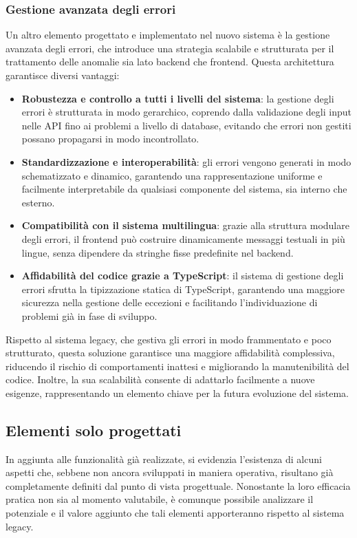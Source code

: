 \subsubsection{Gestione avanzata degli errori}
Un altro elemento progettato e implementato nel nuovo sistema è la gestione avanzata degli errori, che introduce una strategia scalabile e strutturata per il trattamento delle anomalie sia lato backend che frontend.
%
Questa architettura garantisce diversi vantaggi:
\begin{itemize}
  \item \textbf{Robustezza e controllo a tutti i livelli del sistema}: la gestione degli errori è strutturata in modo gerarchico, coprendo dalla validazione degli input nelle API fino ai problemi a livello di database, evitando che errori non gestiti possano propagarsi in modo incontrollato.
  \item \textbf{Standardizzazione e interoperabilità}: gli errori vengono generati in modo schematizzato e dinamico, garantendo una rappresentazione uniforme e facilmente interpretabile da qualsiasi componente del sistema, sia interno che esterno.
  \item \textbf{Compatibilità con il sistema multilingua}: grazie alla struttura modulare degli errori, il frontend può costruire dinamicamente messaggi testuali in più lingue, senza dipendere da stringhe fisse predefinite nel backend.
  \item \textbf{Affidabilità del codice grazie a TypeScript}: il sistema di gestione degli errori sfrutta la tipizzazione statica di TypeScript, garantendo una maggiore sicurezza nella gestione delle eccezioni e facilitando l’individuazione di problemi già in fase di sviluppo.
\end{itemize}

Rispetto al sistema legacy, che gestiva gli errori in modo frammentato e poco strutturato, questa soluzione garantisce una maggiore affidabilità complessiva, riducendo il rischio di comportamenti inattesi e migliorando la manutenibilità del codice. Inoltre, la sua scalabilità consente di adattarlo facilmente a nuove esigenze, rappresentando un elemento chiave per la futura evoluzione del sistema.

\subsection{Elementi solo progettati}
In aggiunta alle funzionalità già realizzate, si evidenzia l’esistenza di alcuni aspetti che, sebbene non ancora sviluppati in maniera operativa, risultano già completamente definiti dal punto di vista progettuale. Nonostante la loro efficacia pratica non sia al momento valutabile, è comunque possibile analizzare il potenziale e il valore aggiunto che tali elementi apporteranno rispetto al sistema legacy.

